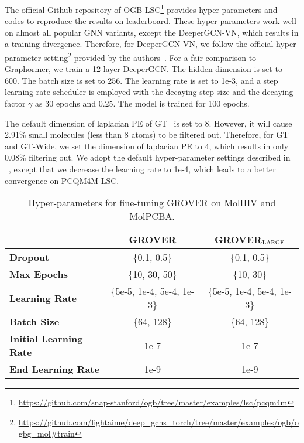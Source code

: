 \documentclass{article}
\begin{document}
The official Github repository of OGB-LSC\footnote{\url{https://github.com/snap-stanford/ogb/tree/master/examples/lsc/pcqm4m}} provides hyper-parameters and codes to reproduce the results on leaderboard. These hyper-parameters work well on almost all popular GNN variants, except the DeeperGCN-{\scriptsize VN}, which results in a training divergence. Therefore, for DeeperGCN-{\scriptsize VN}, we follow the official hyper-parameter setting\footnote{\url{https://github.com/lightaime/deep_gcns_torch/tree/master/examples/ogb/ogbg_mol\#train}} provided by the authors~\cite{li2020deepergcn}. For a fair comparison to Graphormer, we train a 12-layer DeeperGCN. The hidden dimension is set to 600. The batch size is set to 256. The learning rate is set to 1e-3, and a step learning rate scheduler is employed with the decaying step size and the decaying factor $\gamma$ as 30 epochs and 0.25. The model is trained for 100 epochs.

The default dimension of laplacian PE of GT~\cite{dwivedi2021generalization} is set to 8. However, it will cause 2.91\% small molecules (less than 8 atoms) to be filtered out. Therefore, for GT and GT-{\scriptsize Wide}, we set the dimension of laplacian PE to 4, which results in only 0.08\% filtering out. We adopt the default hyper-parameter settings described in ~\cite{dwivedi2021generalization}, except that we decrease the learning rate to 1e-4, which leads to a better convergence on PCQM4M-LSC.

\begin{table*}[t]
\centering 
\caption{Hyper-parameters for fine-tuning GROVER on MolHIV and MolPCBA. } \label{tab:grover_details}
\begin{threeparttable}
\begin{tabular}{lcc}
\toprule
& GROVER & GROVER$_{\small \textsc{LARGE}}$ \\ \hline
\textbf{Dropout} & \{0.1, 0.5\} & \{0.1, 0.5\} \\ 
\textbf{Max Epochs} & \{10, 30, 50\} & \{10, 30\} \\ 
\textbf{Learning Rate} & \{5e-5, 1e-4, 5e-4, 1e-3\} & \{5e-5, 1e-4, 5e-4, 1e-3\} \\ 
\textbf{Batch Size} & \{64, 128\} & \{64, 128\} \\ 
\textbf{Initial Learning Rate} & 1e-7 & 1e-7 \\
\textbf{End Learning Rate} & 1e-9 & 1e-9 \\
\bottomrule
\end{tabular}
\end{threeparttable}
\end{table*}
\end{document}
